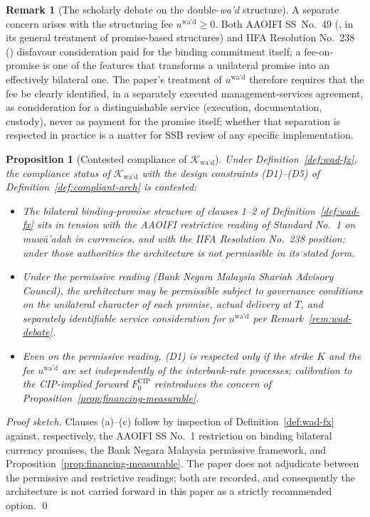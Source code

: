 \documentclass[preprint,12pt,authoryear]{elsarticle}
\newtheorem{proposition}{Proposition}[section]
\theoremstyle{definition}
\newtheorem{remark}{Remark}[section]
\begin{document}
\begin{remark}[The scholarly debate on the double-\emph{wa'd}
    structure]
A separate concern arises with the structuring fee
$u^{\text{wa'd}} \geq 0$. Both AAOIFI SS~No.~49
(\citealp{AAOIFI-SS49}, in its general treatment of promise-based
structures) and IIFA Resolution No.~238
(\citealp{OICFiqh238}) disfavour consideration paid for the
binding commitment itself; a fee-on-promise is one of the features that transforms
a unilateral promise into an effectively bilateral one. The
paper's treatment of $u^{\text{wa'd}}$ therefore requires that
the fee be clearly identified, in a separately executed
management-services agreement, as consideration for a
distinguishable service (execution, documentation, custody),
never as payment for the promise itself; whether that
separation is respected in practice is a matter for SSB review
of any specific implementation.
\end{remark}

\begin{proposition}[Contested compliance of
    $\mathcal{K}_{\text{wa'd}}$]
\label{prop:wad-comply}
Under Definition~\ref{def:wad-fx}, the compliance status of
$\mathcal{K}_{\text{wa'd}}$ with the design constraints
(D1)--(D5) of Definition~\ref{def:compliant-arch} is contested:
\begin{itemize}
    \item[(a)] The bilateral binding-promise structure of clauses
    1--2 of Definition~\ref{def:wad-fx} sits in tension with the
    AAOIFI restrictive reading of Standard No.~1 on
    \emph{muw\={a}'adah} in currencies, and with the IIFA
    Resolution No.~238 position; under those authorities the
    architecture is not permissible in its stated form.
    \item[(b)] Under the permissive reading (Bank Negara Malaysia
    Shariah Advisory Council), the architecture may be
    permissible subject to governance conditions on the
    unilateral character of each promise, actual delivery at $T$,
    and separately identifiable service consideration for
    $u^{\text{wa'd}}$ per Remark~\ref{rem:wad-debate}.
    \item[(c)] Even on the permissive reading, (D1) is respected
    only if the strike $K$ and the fee $u^{\text{wa'd}}$ are set
    independently of the interbank-rate processes; calibration
    to the CIP-implied forward $F^{\text{CIP}}_0$ reintroduces
    the concern of Proposition~\ref{prop:financing-measurable}.
\end{itemize}
\end{proposition}

\begin{proof}[Proof sketch]
Clauses (a)--(c) follow by inspection of Definition~\ref{def:wad-fx}
against, respectively, the AAOIFI SS No.~1 restriction on
binding bilateral currency promises, the Bank Negara Malaysia
permissive framework, and
Proposition~\ref{prop:financing-measurable}. The paper does not
adjudicate between the permissive and restrictive readings;
both are recorded, and consequently the architecture is not
carried forward in this paper as a strictly recommended option.
\qed
\end{proof}
\end{document}
